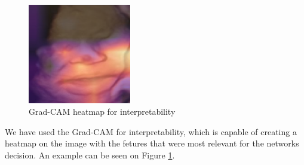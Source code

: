 \begin{figure}[htbp]
    \centering
    \includegraphics[width=0.4\textwidth]{imgs/chap4_gradcam.png}
    \caption{Grad-CAM heatmap for interpretability}
    \label{fig:gradcam}
\end{figure}

We have used the Grad-CAM \citep{SelvarajuCDVPB17} for interpretability, which is capable of creating a heatmap on the image with the fetures that were most relevant for the networks decision. An example can be seen on Figure \ref{fig:gradcam}.


